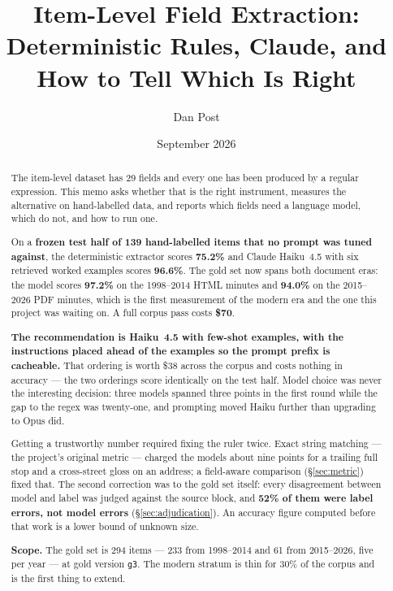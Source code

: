 \documentclass[11pt]{article}
\title{Item-Level Field Extraction:\\
Deterministic Rules, Claude, and How to Tell Which Is Right}
\author{Dan Post}
\date{September 2026}
\begin{document}
\maketitle

\begin{abstract}
\noindent
The item-level dataset has 29 fields and every one has been produced by a regular
expression. This memo asks whether that is the right instrument, measures the alternative on
hand-labelled data, and reports which fields need a language model, which do not, and how to
run one.

\medskip\noindent
On a \textbf{frozen test half of 139 hand-labelled items that no prompt was tuned against},
the deterministic extractor scores \textbf{75.2\%} and Claude Haiku~4.5 with six retrieved
worked examples scores \textbf{96.6\%}. The gold set now spans both document eras: the model
scores \textbf{97.2\%} on the 1998--2014 HTML minutes and \textbf{94.0\%} on the 2015--2026
PDF minutes, which is the first measurement of the modern era and the one this project was
waiting on. A full corpus pass costs \textbf{\$70}.

\medskip\noindent
\textbf{The recommendation is Haiku~4.5 with few-shot examples, with the instructions placed
ahead of the examples so the prompt prefix is cacheable.} That ordering is worth \$38 across
the corpus and costs nothing in accuracy --- the two orderings score identically on the test
half. Model choice was never the interesting decision: three models spanned three points in
the first round while the gap to the regex was twenty-one, and prompting moved Haiku further
than upgrading to Opus did.

\medskip\noindent
Getting a trustworthy number required fixing the ruler twice. Exact string matching --- the
project's original metric --- charged the models about nine points for a trailing full stop
and a cross-street gloss on an address; a field-aware comparison (\S\ref{sec:metric}) fixed
that. The second correction was to the gold set itself: every disagreement between model and
label was judged against the source block, and \textbf{52\% of them were label errors, not
model errors} (\S\ref{sec:adjudication}). An accuracy figure computed before that work is a
lower bound of unknown size.

\medskip\noindent
\textbf{Scope.} The gold set is 294 items --- 233 from 1998--2014 and 61 from 2015--2026,
five per year --- at gold version \texttt{g3}. The modern stratum is thin for 30\% of the
corpus and is the first thing to extend.
\end{abstract}
\end{document}
